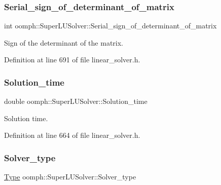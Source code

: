 \subsubsection{\texorpdfstring{Serial\+\_\+sign\+\_\+of\+\_\+determinant\+\_\+of\+\_\+matrix}{Serial\_sign\_of\_determinant\_of\_matrix}}
{\footnotesize\ttfamily int oomph\+::\+Super\+L\+U\+Solver\+::\+Serial\+\_\+sign\+\_\+of\+\_\+determinant\+\_\+of\+\_\+matrix\hspace{0.3cm}{\ttfamily [private]}}



Sign of the determinant of the matrix. 



Definition at line 691 of file linear\+\_\+solver.\+h.

\mbox{\label{classoomph_1_1SuperLUSolver_a45c813ff80cad04e58efebe9bb1bfecb}} 
\subsubsection{\texorpdfstring{Solution\+\_\+time}{Solution\_time}}
{\footnotesize\ttfamily double oomph\+::\+Super\+L\+U\+Solver\+::\+Solution\+\_\+time\hspace{0.3cm}{\ttfamily [private]}}



Solution time. 



Definition at line 664 of file linear\+\_\+solver.\+h.

\mbox{\label{classoomph_1_1SuperLUSolver_a26ba07c6f63b830e73c594debe9e68a9}} 
\subsubsection{\texorpdfstring{Solver\+\_\+type}{Solver\_type}}
{\footnotesize\ttfamily \hyperlink{classoomph_1_1SuperLUSolver_a55d3709b5e082ecce2b41f9db6716e1a}{Type} oomph\+::\+Super\+L\+U\+Solver\+::\+Solver\+\_\+type\hspace{0.3cm}{\ttfamily [private]}}



